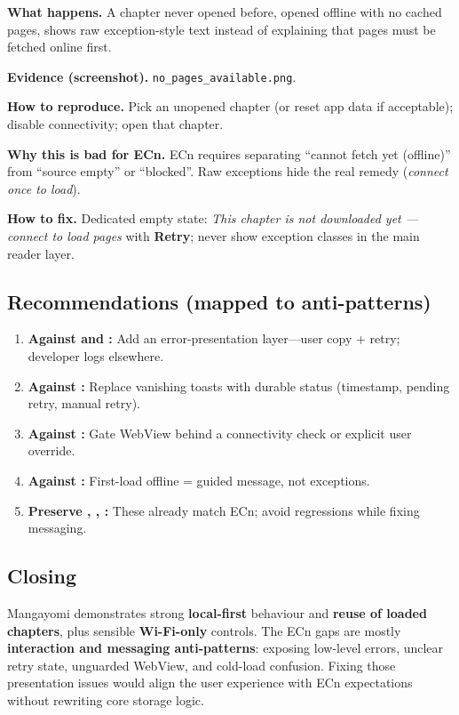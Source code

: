 \textbf{What happens.} A chapter never opened before, opened offline with no cached pages, shows raw exception-style text instead of explaining that pages must be fetched online first.

\textbf{Evidence (screenshot).} \texttt{no\_pages\_available.png}.


\textbf{How to reproduce.} Pick an unopened chapter (or reset app data if acceptable); disable connectivity; open that chapter.

\textbf{Why this is bad for ECn.} ECn requires separating ``cannot fetch yet (offline)'' from ``source empty'' or ``blocked''. Raw exceptions hide the real remedy (\emph{connect once to load}).

\textbf{How to fix.} Dedicated empty state: \emph{This chapter is not downloaded yet --- connect to load pages} with \textbf{Retry}; never show exception classes in the main reader layer.

\subsection{Recommendations (mapped to anti-patterns)}
\label{sec:ecn-recommendations}

\begin{enumerate}\itemsep3pt
  \item \textbf{Against  and :} Add an error-presentation layer---user copy + retry; developer logs elsewhere.
  \item \textbf{Against :} Replace vanishing toasts with durable status (timestamp, pending retry, manual retry).
  \item \textbf{Against :} Gate WebView behind a connectivity check or explicit user override.
  \item \textbf{Against :} First-load offline = guided message, not exceptions.
  \item \textbf{Preserve , , :} These already match ECn; avoid regressions while fixing messaging.
\end{enumerate}

\subsection*{Closing}

Mangayomi demonstrates strong \textbf{local-first} behaviour and \textbf{reuse of loaded chapters}, plus sensible \textbf{Wi-Fi-only} controls. The ECn gaps are mostly \textbf{interaction and messaging anti-patterns}: exposing low-level errors, unclear retry state, unguarded WebView, and cold-load confusion. Fixing those presentation issues would align the user experience with ECn expectations without rewriting core storage logic.
